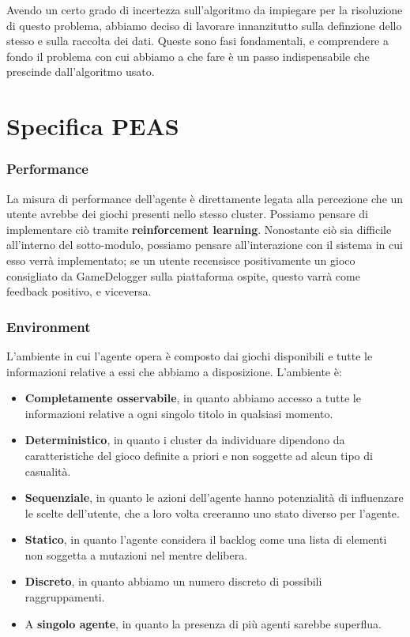 Avendo un certo grado di incertezza sull'algoritmo da impiegare per la risoluzione di questo problema, abbiamo deciso di lavorare innanzitutto sulla definzione dello stesso e sulla raccolta dei dati. Queste sono fasi fondamentali, e comprendere a fondo il problema con cui abbiamo a che fare è un passo indispensabile che prescinde dall'algoritmo usato.

\section{Specifica PEAS}
    \subsubsection{Performance}
        La misura di performance dell'agente è direttamente legata alla percezione che un utente avrebbe dei giochi presenti nello stesso cluster. Possiamo pensare di implementare ciò tramite \textbf{reinforcement learning}. Nonostante ciò sia difficile all'interno del sotto-modulo, possiamo pensare all'interazione con il sistema in cui esso verrà implementato; se un utente recensisce positivamente un gioco consigliato da GameDelogger sulla piattaforma ospite, questo varrà come feedback positivo, e viceversa.
        
    \subsubsection{Environment}
        L'ambiente in cui l'agente opera è composto dai giochi disponibili e tutte le informazioni relative a essi che abbiamo a disposizione. L'ambiente è:
        \begin{itemize}
            \item \textbf{Completamente osservabile}, in quanto abbiamo accesso a tutte le informazioni relative a ogni singolo titolo in qualsiasi momento.
            \item \textbf{Deterministico}, in quanto i cluster da individuare dipendono da caratteristiche del gioco definite a priori e non soggette ad alcun tipo di casualità.
            \item \textbf{Sequenziale}, in quanto le azioni dell'agente hanno potenzialità di influenzare le scelte dell'utente, che a loro volta creeranno uno stato diverso per l'agente.
            \item \textbf{Statico}, in quanto l'agente considera il backlog come una lista di elementi non soggetta a mutazioni nel mentre delibera.
            \item \textbf{Discreto}, in quanto abbiamo un numero discreto di possibili raggruppamenti.
            \item A \textbf{singolo agente}, in quanto la presenza di più agenti sarebbe superflua.
        \end{itemize}
        
